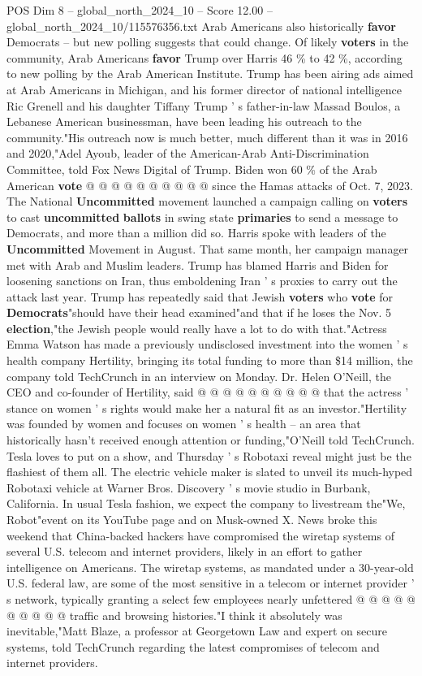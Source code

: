 \begin{textsample}{POS Dim 8 – global\_north\_2024\_10 – Score 12.00 – global\_north\_2024\_10/115576356.txt}
Arab Americans also historically \textbf{favor} Democrats -- but new polling suggests that could change.
Of likely \textbf{voters} in the community, Arab Americans \textbf{favor} Trump over Harris 46 \% to 42 \%, according to new polling by the Arab American Institute.
Trump has been airing ads aimed at Arab Americans in Michigan, and his former director of national intelligence Ric Grenell and his daughter Tiffany Trump ' s father-in-law Massad Boulos, a Lebanese American businessman, have been leading his outreach to the community."His outreach now is much better, much different than it was in 2016 and 2020,"Adel Ayoub, leader of the American-Arab Anti-Discrimination Committee, told Fox News Digital of Trump.
Biden won 60 \% of the Arab American \textbf{vote} @ @ @ @ @ @ @ @ @ @ since the Hamas attacks of Oct. 7, 2023.
The National \textbf{Uncommitted} movement launched a campaign calling on \textbf{voters} to cast \textbf{uncommitted} \textbf{ballots} in swing state \textbf{primaries} to send a message to Democrats, and more than a million did so.
Harris spoke with leaders of the \textbf{Uncommitted} Movement in August.
That same month, her campaign manager met with Arab and Muslim leaders.
Trump has blamed Harris and Biden for loosening sanctions on Iran, thus emboldening Iran ' s proxies to carry out the attack last year.
Trump has repeatedly said that Jewish \textbf{voters} who \textbf{vote} for \textbf{Democrats}"should have their head examined"and that if he loses the Nov. 5 \textbf{election},"the Jewish people would really have a lot to do with that."Actress Emma Watson has made a previously undisclosed investment into the women ' s health company Hertility, bringing its total funding to more than \$14 million, the company told TechCrunch in an interview on Monday.
Dr.
Helen O'Neill, the CEO and co-founder of Hertility, said @ @ @ @ @ @ @ @ @ @ that the actress ' stance on women ' s rights would make her a natural fit as an investor."Hertility was founded by women and focuses on women ' s health -- an area that historically hasn't received enough attention or funding,"O'Neill told TechCrunch.
Tesla loves to put on a show, and Thursday ' s Robotaxi reveal might just be the flashiest of them all.
The electric vehicle maker is slated to unveil its much-hyped Robotaxi vehicle at Warner Bros.
Discovery ' s movie studio in Burbank, California.
In usual Tesla fashion, we expect the company to livestream the"We, Robot"event on its YouTube page and on Musk-owned X.
News broke this weekend that China-backed hackers have compromised the wiretap systems of several U.S. telecom and internet providers, likely in an effort to gather intelligence on Americans.
The wiretap systems, as mandated under a 30-year-old U.S. federal law, are some of the most sensitive in a telecom or internet provider ' s network, typically granting a select few employees nearly unfettered @ @ @ @ @ @ @ @ @ @ traffic and browsing histories."I think it absolutely was inevitable,"Matt Blaze, a professor at Georgetown Law and expert on secure systems, told TechCrunch regarding the latest compromises of telecom and internet providers.


\end{textsample}
